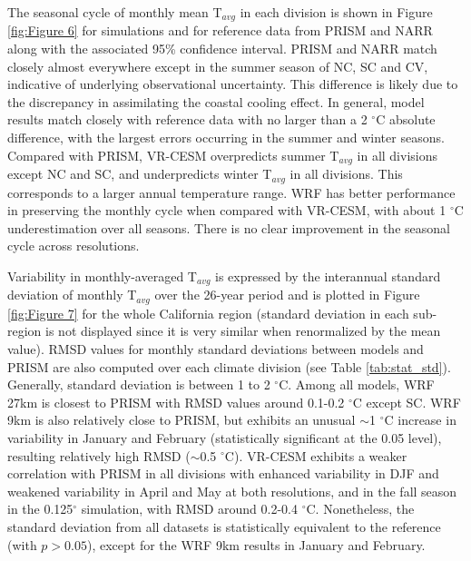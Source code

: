 \documentclass[draft,ms]{agutex}   %
\begin{document}
\begin{article}
The seasonal cycle of monthly mean T$_{avg}$ in each division is shown in Figure \ref{fig:Figure 6} for simulations and for reference data from PRISM and NARR along with the associated 95\% confidence interval. PRISM and NARR match closely almost everywhere except in the summer season of NC, SC and CV, indicative of underlying observational uncertainty. This difference is likely due to the discrepancy in assimilating the coastal cooling effect.  In general, model results match closely with reference data with no larger than a 2 $^\circ$C absolute difference, with the largest errors occurring in the summer and winter seasons.  Compared with PRISM, VR-CESM overpredicts summer T$_{avg}$ in all divisions except NC and SC, and underpredicts winter T$_{avg}$ in all divisions.  This corresponds to a larger annual temperature range. WRF has better performance in preserving the monthly cycle when compared with VR-CESM, with about 1 $^\circ$C underestimation over all seasons. There is no clear improvement in the seasonal cycle across resolutions.

Variability in monthly-averaged T$_{avg}$ is expressed by the interannual standard deviation of monthly T$_{avg}$ over the 26-year period and is plotted in Figure \ref{fig:Figure 7} for the whole California region (standard deviation in each sub-region is not displayed since it is very similar when renormalized by the mean value).  RMSD values for monthly standard deviations between models and PRISM are also computed over each climate division (see Table \ref{tab:stat_std}). Generally, standard deviation is between 1 to 2 $^\circ$C. Among all models, WRF 27km is closest to PRISM with RMSD values around 0.1-0.2 $^\circ$C except SC. WRF 9km is also relatively close to PRISM, but exhibits an unusual $\sim$1 $^\circ$C increase in variability in January and February (statistically significant at the 0.05 level), resulting relatively high RMSD ($\sim$0.5 $^\circ$C). VR-CESM exhibits a weaker correlation with PRISM in all divisions with enhanced variability in DJF and weakened variability in April and May at both resolutions, and in the fall season in the 0.125$^\circ$ simulation, with RMSD around 0.2-0.4 $^\circ$C. Nonetheless, the standard deviation from all datasets is statistically equivalent to the reference (with $p > 0.05$), except for the WRF 9km results in January and February.


\end{article}
\end{document}
